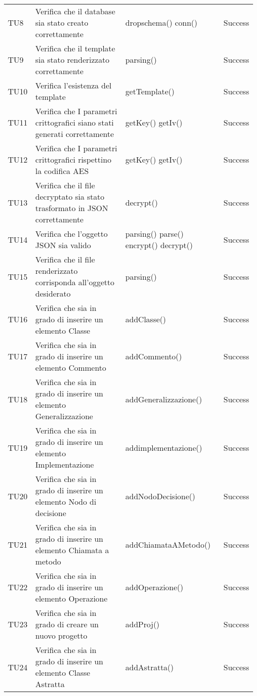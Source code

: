 \begin{longtable}{p{2cm}!{\VRule[1pt]}p{5cm}!{\VRule[1pt]}p{4.5cm}!{\VRule[1pt]}p{1.5cm}}
TU8 & Verifica che il database sia stato creato correttamente & dropschema() \newline conn() & Success  \\ 
TU9 & Verifica che il template sia stato renderizzato correttamente & parsing() & Success  \\ 
TU10 & Verifica l'esistenza del template & getTemplate() & Success  \\ 
TU11 & Verifica che I parametri crittografici siano stati generati correttamente & getKey() \newline getIv() & Success  \\ 
TU12 & Verifica che I parametri crittografici rispettino la codifica AES & getKey() \newline getIv() & Success  \\ 
TU13 & Verifica che il file decryptato sia stato trasformato in JSON correttamente & decrypt() & Success  \\ 
TU14 & Verifica che l'oggetto JSON sia valido & parsing() \newline parse() \newline encrypt() \newline decrypt() & Success  \\ 
TU15 & Verifica che il file renderizzato corrisponda all'oggetto desiderato & parsing() & Success  \\ 
TU16 & Verifica che sia in grado di inserire un elemento Classe & addClasse() & Success  \\ 
TU17 & Verifica che sia in grado di inserire un elemento Commento & addCommento() & Success  \\ 
TU18 & Verifica che sia in grado di inserire un elemento Generalizzazione & addGeneralizzazione() & Success  \\ 
TU19 & Verifica che sia in grado di inserire un elemento Implementazione & addimplementazione() & Success  \\ 
TU20 & Verifica che sia in grado di inserire un elemento Nodo di decisione & addNodoDecisione() & Success  \\ 
TU21 & Verifica che sia in grado di inserire un elemento Chiamata a metodo & addChiamataAMetodo() & Success  \\ 
TU22 & Verifica che sia in grado di inserire un elemento Operazione & addOperazione() & Success  \\ 
TU23 & Verifica che sia in grado di creare un nuovo progetto & addProj() & Success  \\ 
TU24 & Verifica che sia in grado di inserire un elemento Classe Astratta & addAstratta() & Success  \\ 

\end{longtable}
